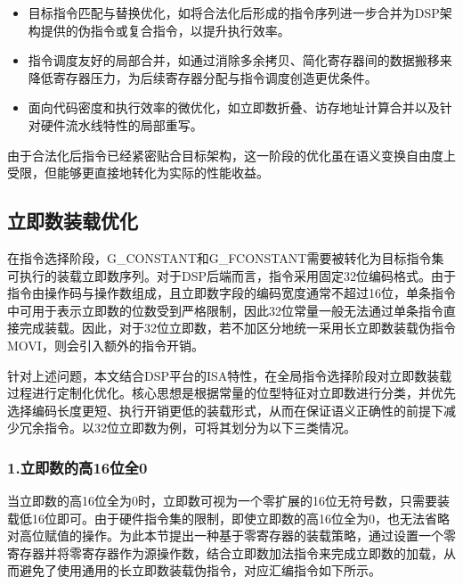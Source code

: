 \begin{itemize}
	\item
	目标指令匹配与替换优化，如将合法化后形成的指令序列进一步合并为DSP架构提供的伪指令或复合指令，以提升执行效率。
	
	\item
	指令调度友好的局部合并，如通过消除多余拷贝、简化寄存器间的数据搬移来降低寄存器压力，为后续寄存器分配与指令调度创造更优条件。
	
	\item 
	面向代码密度和执行效率的微优化，如立即数折叠、访存地址计算合并以及针对硬件流水线特性的局部重写。
	
\end{itemize}

由于合法化后指令已经紧密贴合目标架构，这一阶段的优化虽在语义变换自由度上受限，但能够更直接地转化为实际的性能收益。


\subsection{立即数装载优化}
在指令选择阶段，G\_CONSTANT和G\_FCONSTANT需要被转化为目标指令集可执行的装载立即数序列。对于DSP后端而言，指令采用固定32位编码格式。由于指令由操作码与操作数组成，且立即数字段的编码宽度通常不超过16位，单条指令中可用于表示立即数的位数受到严格限制，因此32位常量一般无法通过单条指令直接完成装载。因此，对于32位立即数，若不加区分地统一采用长立即数装载伪指令MOVI，则会引入额外的指令开销。

\par

针对上述问题，本文结合DSP平台的ISA特性，在全局指令选择阶段对立即数装载过程进行定制化优化。核心思想是根据常量的位型特征对立即数进行分类，并优先选择编码长度更短、执行开销更低的装载形式，从而在保证语义正确性的前提下减少冗余指令。以32位立即数为例，可将其划分为以下三类情况。


\subsubsection{1.立即数的高16位全0}
当立即数的高16位全为0时，立即数可视为一个零扩展的16位无符号数，只需要装载低16位即可。由于硬件指令集的限制，即使立即数的高16位全为0，也无法省略对高位赋值的操作。为此本节提出一种基于零寄存器的装载策略，通过设置一个零寄存器并将零寄存器作为源操作数，结合立即数加法指令来完成立即数的加载，从而避免了使用通用的长立即数装载伪指令，对应汇编指令如下所示。

